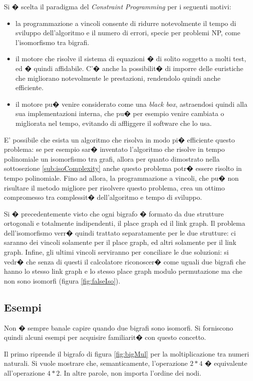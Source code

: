 Si � scelta il paradigma del \emph{Constraint Programming} per i seguenti motivi:
\begin{itemize}
	\item
	la programmazione a vincoli consente di ridurre notevolmente il tempo di sviluppo dell'algoritmo e il numero di errori, specie per problemi NP, come l'isomorfismo tra bigrafi.
	\item
	il motore che risolve il sistema di equazioni � di solito soggetto a molti test, ed � quindi affidabile. C'� anche la possibilit� di imporre delle euristiche che migliorano notevolmente le prestazioni, rendendolo quindi anche efficiente.
	\item
	il motore pu� venire considerato come una \emph{black box}, astraendosi quindi alla sua implementazioni interna, che pu� per esempio venire cambiata o migliorata nel tempo, evitando di affliggere il software che lo usa.
\end{itemize}
E' possibile che esista un algoritmo che risolva in modo pi� efficiente questo problema: se per esempio sar� inventato l'algoritmo che risolve in tempo polinomiale un isomorfismo tra grafi, allora per quanto dimostrato nella sottosezione \ref{sub:isoComplexity} anche questo problema potr� essere risolto in tempo polinomiale. Fino ad allora, la programmazione a vincoli, che pu� non risultare il metodo migliore per risolvere questo problema, crea un ottimo compromesso tra complessit� dell'algoritmo e tempo di sviluppo.


Si � precedentemente visto che ogni bigrafo � formato da due strutture ortogonali e totalmente indipendenti, il place graph ed il link graph. Il problema dell'isomorfismo verr� quindi trattato
separatamente per le due strutture: ci saranno dei vincoli solamente per il place graph, ed altri solamente per il link graph. Infine, gli ultimi vincoli serviranno per conciliare le due soluzioni: si vedr� che senza di questi il calcolatore riconoscer� come uguali due bigrafi che hanno lo stesso link graph e lo stesso place graph modulo permutazione ma che non sono isomorfi (figura \ref{fig:falseIso}).


\subsection{Esempi}\label{sub:isoExamples}
Non � sempre banale capire quando due bigrafi sono isomorfi. Si forniscono quindi alcuni esempi per acquisire familiarit� con questo concetto. 

Il primo riprende il bigrafo di figura \ref{fig:bigMul} per la moltiplicazione tra numeri naturali. Si vuole mostrare che, semanticamente, l'operazione $2*4$ � equivalente
all'operazione $4*2$. In altre parole, non importa l'ordine dei nodi.

